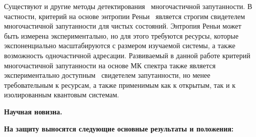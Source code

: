 Существуют и другие методы детектирования~\cite{Guhne2009} многочастичной запутанности.
В частности, критерий на основе энтропии Реньи~\cite{Hosur2016, Fan2017}
является строгим свидетелем многочастичной запутанности для чистых состояний.
Энтропия Реньи может быть измерена экспериментально,
но для этого требуются ресурсы,
которые экспоненциально масштабируются с размером изучаемой системы,
а также возможность одночастичной адресации.
Развиваемый в данной работе критерий многочастичной запутанности на основе МК спектра
также является экспериментально доступным~\cite{Baum1985} свидетелем запутанности,
но менее требовательным к ресурсам,
а также применимым как к открытым,
так и к изолированным квантовым системам.





\textbf{Научная новизна.}


\textbf{На защиту выносятся следующие основные результаты и положения:}


